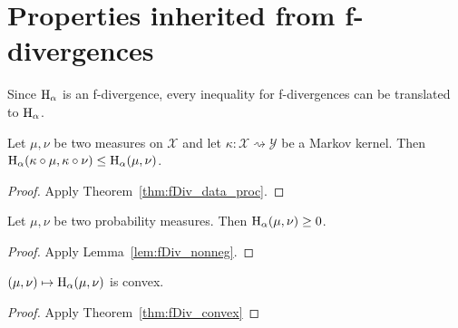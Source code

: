 \section{Properties inherited from f-divergences}

Since $\operatorname{H}_\alpha$ is an f-divergence, every inequality for f-divergences can be translated to $\operatorname{H}_\alpha$.

\begin{theorem}
  \label{thm:hellingerAlpha_data_proc}
  Let $\mu, \nu$ be two measures on $\mathcal X$ and let $\kappa : \mathcal X \rightsquigarrow \mathcal Y$ be a Markov kernel.
  Then $\operatorname{H}_\alpha(\kappa \circ \mu, \kappa \circ \nu) \le \operatorname{H}_\alpha(\mu, \nu)$.
\end{theorem}

\begin{proof}
Apply Theorem~\ref{thm:fDiv_data_proc}.
\end{proof}

\begin{lemma}
  \label{lem:hellingerAlpha_nonneg}
  \leanok
  Let $\mu, \nu$ be two probability measures. Then $\operatorname{H}_\alpha(\mu, \nu) \ge 0$.
\end{lemma}

\begin{proof} \leanok
{}
Apply Lemma~\ref{lem:fDiv_nonneg}.
\end{proof}

\begin{lemma}
  \label{lem:hellingerAlpha_convex}
  $(\mu, \nu) \mapsto \operatorname{H}_\alpha(\mu, \nu)$ is convex.
\end{lemma}

\begin{proof}
Apply Theorem~\ref{thm:fDiv_convex}
\end{proof}
